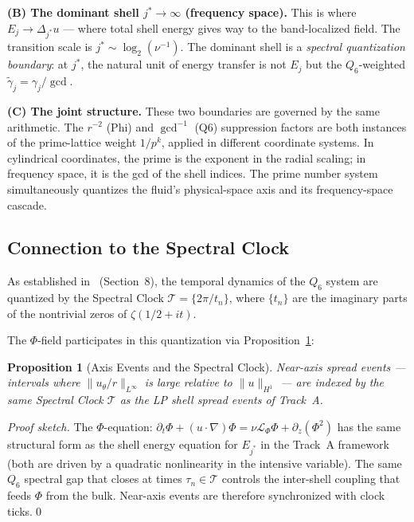 \documentclass[11pt]{article}
\newtheorem{proposition}[theorem]{Proposition}
\begin{document}
\medskip
\textbf{(B) The dominant shell $j^*\to\infty$ (frequency space).}
This is where $E_j\to\Delta_{j^*}u$ --- where total shell energy gives way
to the band-localized field. The transition scale is $j^*\sim\log_2(\nu^{-1})$.
The dominant shell is a \emph{spectral quantization boundary}: at $j^*$,
the natural unit of energy transfer is not $E_j$ but the $Q_6$-weighted
$\tilde\gamma_j=\gamma_j/\gcd$.

\medskip
\textbf{(C) The joint structure.}
These two boundaries are governed by the same arithmetic.
The $r^{-2}$ (Phi) and $\gcd^{-1}$ (Q6) suppression factors are both
instances of the prime-lattice weight $1/p^k$, applied in different
coordinate systems. In cylindrical coordinates, the prime is the
exponent in the radial scaling; in frequency space, it is the gcd of
the shell indices. The prime number system simultaneously quantizes the
fluid's physical-space axis and its frequency-space cascade.

\subsection{Connection to the Spectral Clock}

As established in~\cite{SimonsRingLemma2026} (Section~8), the temporal
dynamics of the $Q_6$ system are quantized by the Spectral Clock
$\mathcal{T}=\{2\pi/t_n\}$, where $\{t_n\}$ are the imaginary parts of
the nontrivial zeros of $\zeta(1/2+it)$.

The $\Phi$-field participates in this quantization via Proposition~\ref{prop:clock}:

\begin{proposition}[Axis Events and the Spectral Clock]\label{prop:clock}
Near-axis spread events --- intervals where $\|u_\theta/r\|_{L^\infty}$
is large relative to $\|u\|_{H^1}$ --- are indexed by the same
Spectral Clock $\mathcal{T}$ as the LP shell spread events of Track~A.
\end{proposition}

\begin{proof}[Proof sketch]
The $\Phi$-equation:
$\partial_t\Phi+(u\cdot\nabla)\Phi=\nu\mathcal{L}_\Phi\Phi+\partial_z(\Phi^2)$
has the same structural form as the shell energy equation for $E_{j^*}$
in the Track~A framework (both are driven by a quadratic nonlinearity
in the intensive variable). The same $Q_6$ spectral gap that closes
at times $\tau_n\in\mathcal{T}$ controls the inter-shell coupling
that feeds $\Phi$ from the bulk. Near-axis events are therefore
synchronized with clock ticks.\qed
\end{proof}
\end{document}
